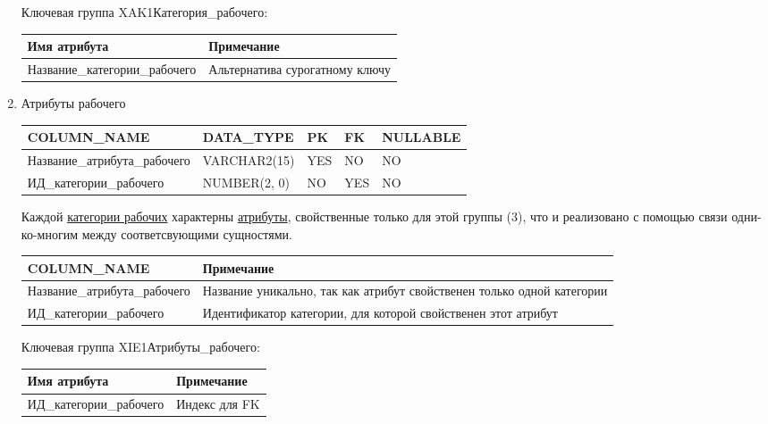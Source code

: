 \begin{enumerate}
    Ключевая группа XAK1Категория\_рабочего:

    \begin{tabular}{|p{4cm}|p{5cm}|} \hline

        {\bf Имя атрибута} & {\bf Примечание} \\ \hline
        Название\_категории\_рабочего & Альтернатива сурогатному ключу \\ \hline

    \end{tabular}

    \item{Атрибуты рабочего}

    \begin{tabular}{|p{4cm}|p{3cm}|p{1cm}|p{1cm}|p{2cm}|} \hline

        {\bf COLUMN\_NAME} & {\bf DATA\_TYPE} & {\bf PK} & {\bf FK} & {\bf NULLABLE} \\ \hline
        Название\_атрибута\_рабочего & VARCHAR2(15) & YES & NO & NO \\ \hline
        ИД\_категории\_рабочего & NUMBER(2, 0) & NO & YES & NO \\ \hline

    \end{tabular}

    Каждой \underline{категории рабочих} характерны \underline{атрибуты}, свойственные только для этой группы (3), что и реализовано с помощью связи одни-ко-многим между соответсвующими сущностями.

    \begin{tabular}{|p{4cm}|p{5cm}|} \hline

        {\bf COLUMN\_NAME} & {\bf Примечание} \\ \hline
        Название\_атрибута\_рабочего & Название уникально, так как атрибут свойственен только одной категории \\ \hline
        ИД\_категории\_рабочего & Идентификатор категории, для которой свойственен этот атрибут \\ \hline

    \end{tabular}

    Ключевая группа XIE1Атрибуты\_рабочего:

    \begin{tabular}{|p{4cm}|p{5cm}|} \hline

        {\bf Имя атрибута} & {\bf Примечание} \\ \hline
        ИД\_категории\_рабочего & Индекс для FK \\ \hline


\end{tabular}
\end{enumerate}
